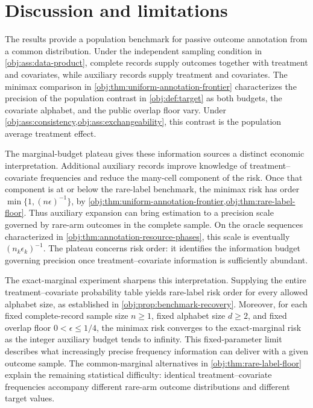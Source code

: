 \section{Discussion and limitations}

The results provide a population benchmark for passive outcome annotation from a common distribution. Under the independent sampling condition in \cref{obj:ass:data-product}, complete records supply outcomes together with treatment and covariates, while auxiliary records supply treatment and covariates. The minimax comparison in \cref{obj:thm:uniform-annotation-frontier} characterizes the precision of the population contrast in \cref{obj:def:target} as both budgets, the covariate alphabet, and the public overlap floor vary. Under \cref{obj:ass:consistency,obj:ass:exchangeability}, this contrast is the population average treatment effect.

The marginal-budget plateau gives these information sources a distinct economic interpretation. Additional auxiliary records improve knowledge of treatment--covariate frequencies and reduce the many-cell component of the risk. Once that component is at or below the rare-label benchmark, the minimax risk has order \(\min\{1,(n\epsilon)^{-1}\}\), by \cref{obj:thm:uniform-annotation-frontier,obj:thm:rare-label-floor}. Thus auxiliary expansion can bring estimation to a precision scale governed by rare-arm outcomes in the complete sample. On the oracle sequences characterized in \cref{obj:thm:annotation-resource-phases}, this scale is eventually \((n_k\epsilon_k)^{-1}\). The plateau concerns risk order: it identifies the information budget governing precision once treatment--covariate information is sufficiently abundant.

The exact-marginal experiment sharpens this interpretation. Supplying the entire treatment--covariate probability table yields rare-label risk order for every allowed alphabet size, as established in \cref{obj:prop:benchmark-recovery}. Moreover, for each fixed complete-record sample size \(n\ge1\), fixed alphabet size \(d\ge2\), and fixed overlap floor \(0<\epsilon\le1/4\), the minimax risk converges to the exact-marginal risk as the integer auxiliary budget tends to infinity. This fixed-parameter limit describes what increasingly precise frequency information can deliver with a given outcome sample. The common-marginal alternatives in \cref{obj:thm:rare-label-floor} explain the remaining statistical difficulty: identical treatment--covariate frequencies accompany different rare-arm outcome distributions and different target values.


